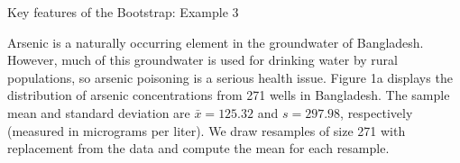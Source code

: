 \documentclass[
  ignorenonframetext,
]{beamer}
\begin{document}
\begin{frame}{Key features of the Bootstrap: Example 3}
\protect\hypertarget{key-features-of-the-bootstrap-example-3}{}
\begin{tcolorbox}
Arsenic is a naturally occurring element in the groundwater of Bangladesh. However, much of this groundwater is used for drinking water by rural populations, so arsenic poisoning is a serious health issue. Figure 1a displays the distribution of arsenic concentrations from 271 wells in Bangladesh. The sample mean and standard deviation are $\bar{x}=125.32$ and $s =297.98$, respectively (measured in micrograms per liter). We draw resamples of size 271 with replacement from the data and compute the mean for each resample.
\end{tcolorbox}
\end{frame}
\end{document}
